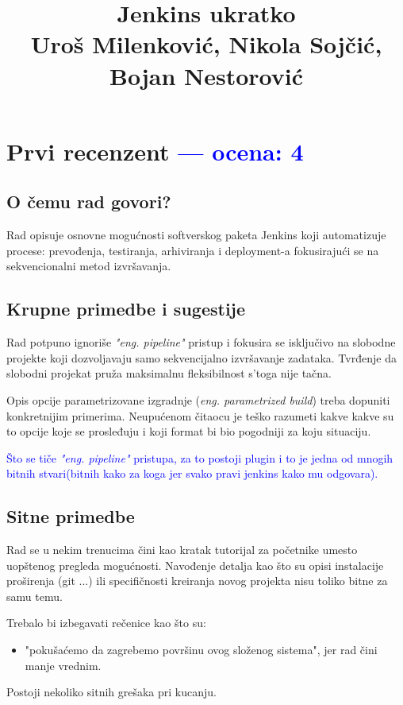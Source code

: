 \documentclass[a4paper]{report}
\newcommand{\odgovor}[1]{\textcolor{blue}{#1}}
\begin{document}
\title{Jenkins ukratko\\
  \small{Uroš Milenković, Nikola Sojčić, Bojan Nestorović
}}

\maketitle
\tableofcontents

\chapter{Prvi recenzent \odgovor{--- ocena: 4} }

\section{O čemu rad govori?}
Rad opisuje osnovne mogućnosti softverskog paketa Jenkins koji automatizuje
procese: prevođenja, testiranja, arhiviranja i deployment-a fokusirajući se na 
sekvencionalni metod izvršavanja.

\section{Krupne primedbe i sugestije}

Rad potpuno ignoriše \textit{"eng. pipeline"} pristup i fokusira se isključivo na slobodne
projekte koji dozvoljavaju samo sekvencijalno izvršavanje zadataka. Tvrđenje da slobodni
projekat pruža maksimalnu fleksibilnost s'toga nije tačna.

Opis opcije parametrizovane izgradnje (\textit{eng. parametrized build}) treba
dopuniti konkretnijim primerima. Neupućenom čitaocu je teško razumeti kakve kakve su
to opcije koje se prosleđuju i koji format bi bio pogodniji za koju situaciju.

\odgovor{Što se tiče \textit{"eng. pipeline"} pristupa, za to postoji plugin i to je jedna od mnogih bitnih stvari(bitnih kako za koga jer svako pravi jenkins kako mu odgovara).}

\section{Sitne primedbe}
Rad se u nekim trenucima čini kao kratak tutorijal za početnike umesto uopštenog
pregleda mogućnosti. Navođenje detalja kao što su opisi instalacije proširenja
(git ...) ili specifičnosti kreiranja novog projekta nisu toliko bitne za 
samu temu.

Trebalo bi izbegavati rečenice kao što su:
\begin{itemize}
  \item "pokušaćemo da zagrebemo površinu ovog složenog sistema", jer rad čini manje vrednim.
\end{itemize}
Postoji nekoliko sitnih grešaka pri kucanju.
\end{document}
